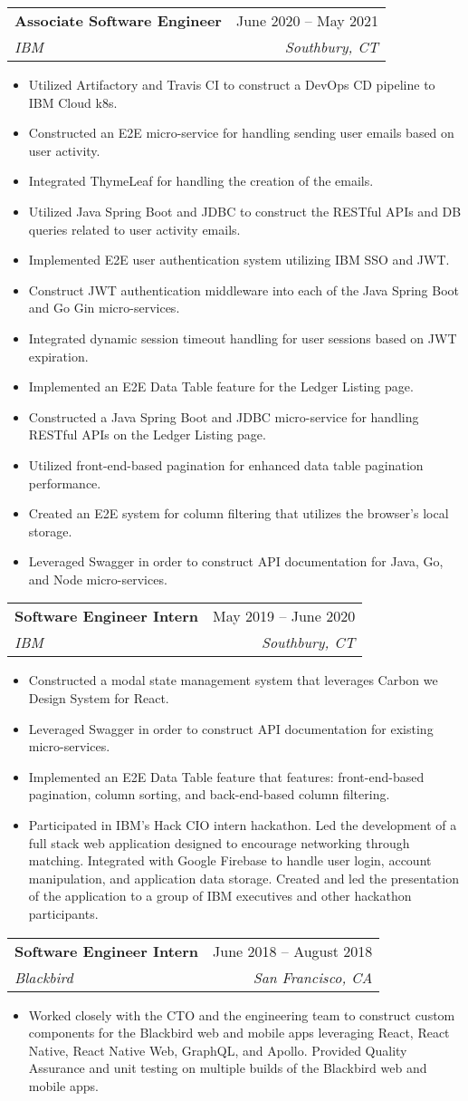 \documentclass[letterpaper,11pt]{article}
\makeatletter
\newcommand{\resumeItem}[1]{
  \item[-] \small{
    {#1 \vspace{-2pt}}
  }
}
\newcommand{\resumeSubheading}[4]{
  \vspace{-2pt}\item
    \begin{tabular*}{0.97\textwidth}[t]{l@{\extracolsep{\fill}}r}
      \textbf{#1} & #2 \\
      \textit{\small#3} & \textit{\small #4} \\
    \end{tabular*}\vspace{-7pt}
}
\newcommand{\resumeItemListStart}{\begin{itemize}[rightmargin=\dimexpr\linewidth-17.25cm-\leftmargin\relax]}
\newcommand{\resumeItemListEnd}{\end{itemize}\vspace{-5pt}}
\makeatother
\begin{document}
\resumeSubheading
{Associate Software Engineer}{June 2020 – May 2021}
{IBM}{Southbury, CT}
\resumeItemListStart
\resumeItem{Utilized Artifactory and Travis CI to construct a DevOps CD pipeline to IBM Cloud k8s.}
\resumeItem{Constructed an E2E micro-service for handling sending user emails based on user activity.}
\resumeItem{Integrated ThymeLeaf for handling the creation of the emails.}
\resumeItem{Utilized Java Spring Boot and JDBC to construct the RESTful APIs and DB queries related to user activity emails.}
\resumeItem{Implemented E2E user authentication system utilizing IBM SSO and JWT.}
\resumeItem{Construct JWT authentication middleware into each of the Java Spring Boot and Go Gin micro-services.}
\resumeItem{Integrated dynamic session timeout handling for user sessions based on JWT expiration.}
\resumeItem{Implemented an E2E Data Table feature for the Ledger Listing page.}
\resumeItem{Constructed a Java Spring Boot and JDBC micro-service for handling RESTful APIs on the Ledger Listing page.}
\resumeItem{Utilized front-end-based pagination for enhanced data table pagination performance.}
\resumeItem{Created an E2E system for column filtering that utilizes the browser's local storage.}
\resumeItem{Leveraged Swagger in order to construct API documentation for Java, Go, and Node micro-services.}
\resumeItemListEnd

\resumeSubheading
{Software Engineer Intern}{May 2019 – June 2020}
{IBM}{Southbury, CT}
\resumeItemListStart
\resumeItem{Constructed a modal state management system that leverages Carbon we Design System for React.}
\resumeItem{Leveraged Swagger in order to construct API documentation for existing micro-services.}
\resumeItem{Implemented an E2E Data Table feature that features: front-end-based pagination, column sorting, and back-end-based column filtering.}
\resumeItem{Participated in IBM's Hack CIO intern hackathon. Led the development of a full stack web application designed to encourage networking through matching. Integrated with Google Firebase to handle user login, account manipulation, and application data storage. Created and led the presentation of the application to a group of IBM executives and other hackathon participants.}
\resumeItemListEnd

\resumeSubheading
{Software Engineer Intern}{June 2018 – August 2018}
{Blackbird}{San Francisco, CA}
\resumeItemListStart
\resumeItem{Worked closely with the CTO and the engineering team to construct custom components for the Blackbird web and mobile apps leveraging React, React Native, React Native Web, GraphQL, and Apollo. Provided Quality Assurance and unit testing on multiple builds of the Blackbird web and mobile apps.}
\resumeItemListEnd
\end{document}
